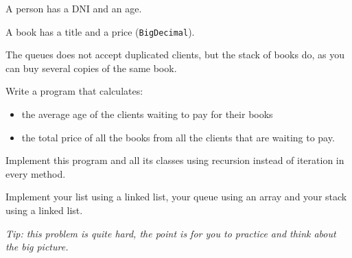 \documentclass[a4paper, 11pt]{article}
\begin{document}
A person has a DNI and an age.

A book has a title and a price (\texttt{BigDecimal}).

The queues does not accept duplicated clients, but the stack of books do, as
you can buy several copies of the same book.

Write a program that calculates:

\begin{itemize}

  \item the average age of the clients waiting to pay for their books

  \item the total price of all the books from all the clients that are waiting to pay.

\end{itemize}

Implement this program and all its classes using recursion instead of iteration
in every method.

Implement your list using a linked list, your queue using an array and your
stack using a linked list.

\textsl{Tip: this problem is quite hard, the point is for you to practice and
think about the big picture.}
\end{document}
